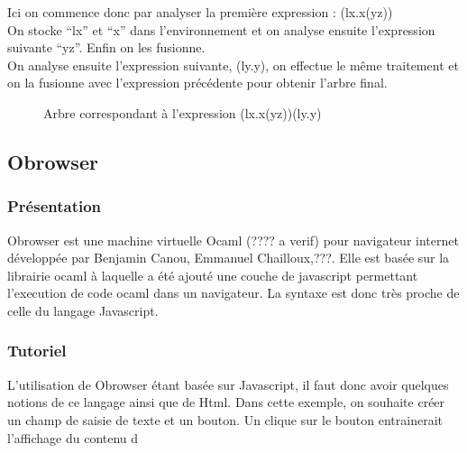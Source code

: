 \documentclass[a4paper,11pt,titlepage]{article}
\begin{document}
\newpage
Ici on commence donc par analyser la première expression : (lx.x(yz))\\
On stocke ``lx'' et ``x'' dans l'environnement et on analyse ensuite l'expression suivante ``yz''. Enfin on les fusionne.\\

On analyse ensuite l'expression suivante, (ly.y), on effectue le même traitement et on la fusionne avec l'expression précédente pour obtenir l'arbre final.
\begin{figure}[H]
\centering
  {
	 {{
		 {
			  {
			   {}
			   {
			      {{}
			       {}}
			   }
			  }
		 }
	 }
	{
		{}


	}}
  }
\caption{Arbre correspondant à l'expression (lx.x(yz))(ly.y)}
 \label{tree3}
\end{figure}

\subsection{Obrowser}

\subsubsection{Présentation}
Obrowser est une machine virtuelle Ocaml (???? a verif) pour navigateur internet développée par Benjamin Canou, Emmanuel Chailloux,???. Elle est basée sur la librairie ocaml à laquelle a été ajouté une couche de javascript permettant l'execution de code ocaml dans un navigateur. La syntaxe est donc très proche de celle du langage Javascript.

\subsubsection{Tutoriel}
L'utilisation de Obrowser étant basée sur Javascript, il faut donc avoir quelques notions de ce langage ainsi que de Html. Dans cette exemple, on souhaite créer un champ de saisie de texte et un bouton. Un clique sur le bouton entrainerait l'affichage du contenu d
\end{document}
